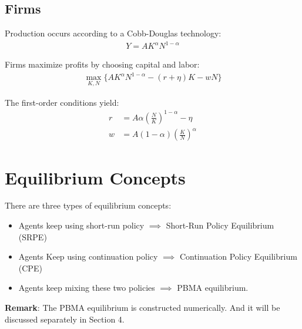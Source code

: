 \documentclass[11pt,a4paper]{article}
\begin{document}
\subsection{Firms}

\noindent Production occurs according to a Cobb-Douglas technology:
\begin{align}
Y = AK^\alpha N^{1-\alpha}
\end{align}

\noindent Firms maximize profits by choosing capital and labor:
\begin{align}
\max_{K,N} \{AK^\alpha N^{1-\alpha} - (r+\eta)K - wN\}
\end{align}

\noindent The first-order conditions yield:
\begin{align}
r &= A\alpha\left(\frac{N}{K}\right)^{1-\alpha} - \eta\\
w &= A(1-\alpha)\left(\frac{K}{N}\right)^{\alpha}
\end{align}

\section{Equilibrium Concepts}

There are three types of equilibrium concepts:

\begin{itemize}
    \item Agents keep using short-run policy $\implies$ Short-Run Policy Equilibrium (SRPE)
    \item Agents Keep using continuation policy $\implies$ Continuation Policy Equilibrium (CPE)
    \item Agents keep mixing these two policies $\implies$ PBMA equilibrium.
\end{itemize}

\noindent \textbf{Remark}: The PBMA equilibrium is constructed numerically. And it will be discussed separately in Section 4.
\end{document}
